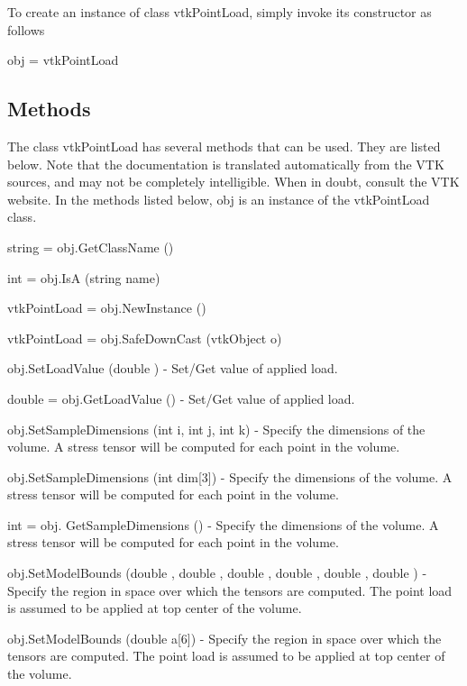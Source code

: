 To create an instance of class vtk\-Point\-Load, simply invoke its constructor as follows \begin{DoxyVerb}  obj = vtkPointLoad
\end{DoxyVerb}
 \hypertarget{vtkwidgets_vtkxyplotwidget_Methods}{}\subsection{Methods}\label{vtkwidgets_vtkxyplotwidget_Methods}
The class vtk\-Point\-Load has several methods that can be used. They are listed below. Note that the documentation is translated automatically from the V\-T\-K sources, and may not be completely intelligible. When in doubt, consult the V\-T\-K website. In the methods listed below, {\ttfamily obj} is an instance of the vtk\-Point\-Load class. 
\begin{DoxyItemize}
\item {\ttfamily string = obj.\-Get\-Class\-Name ()}  
\item {\ttfamily int = obj.\-Is\-A (string name)}  
\item {\ttfamily vtk\-Point\-Load = obj.\-New\-Instance ()}  
\item {\ttfamily vtk\-Point\-Load = obj.\-Safe\-Down\-Cast (vtk\-Object o)}  
\item {\ttfamily obj.\-Set\-Load\-Value (double )} -\/ Set/\-Get value of applied load.  
\item {\ttfamily double = obj.\-Get\-Load\-Value ()} -\/ Set/\-Get value of applied load.  
\item {\ttfamily obj.\-Set\-Sample\-Dimensions (int i, int j, int k)} -\/ Specify the dimensions of the volume. A stress tensor will be computed for each point in the volume.  
\item {\ttfamily obj.\-Set\-Sample\-Dimensions (int dim\mbox{[}3\mbox{]})} -\/ Specify the dimensions of the volume. A stress tensor will be computed for each point in the volume.  
\item {\ttfamily int = obj. Get\-Sample\-Dimensions ()} -\/ Specify the dimensions of the volume. A stress tensor will be computed for each point in the volume.  
\item {\ttfamily obj.\-Set\-Model\-Bounds (double , double , double , double , double , double )} -\/ Specify the region in space over which the tensors are computed. The point load is assumed to be applied at top center of the volume.  
\item {\ttfamily obj.\-Set\-Model\-Bounds (double a\mbox{[}6\mbox{]})} -\/ Specify the region in space over which the tensors are computed. The point load is assumed to be applied at top center of the volume.  

\end{DoxyItemize}
